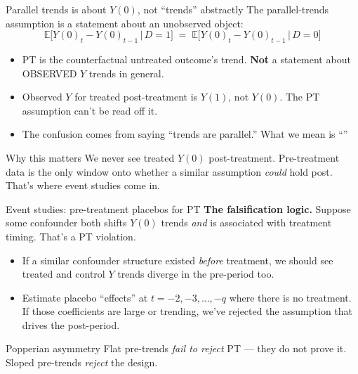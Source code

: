 \documentclass[aspectratio=169,11pt]{beamer}
\begin{document}
\begin{frame}{Parallel trends is about $Y(0)$, not ``trends'' abstractly}
\footnotesize
The parallel-trends assumption is a statement about an unobserved object:
\vspace{-0.3em}
\[
\mathbb{E}\!\big[Y(0)_{t} - Y(0)_{t-1} \,\big|\, D{=}1\big] \;=\; \mathbb{E}\!\big[Y(0)_{t} - Y(0)_{t-1} \,\big|\, D{=}0\big]
\]
\vspace{-0.4em}
\begin{itemize}\setlength\itemsep{2pt}
  \item PT is the counterfactual untreated outcome's trend. \;\textbf{Not} a statement about OBSERVED $Y$ trends in general.
  \item Observed $Y$ for treated post-treatment is $Y(1)$, not $Y(0)$. \;The PT assumption can't be read off it.
  \item The confusion comes from saying ``trends are parallel.'' \;What we mean is ``''
\end{itemize}
\begin{block}{Why this matters}
\scriptsize
We never see treated $Y(0)$ post-treatment. \;Pre-treatment data is the only window onto whether a similar assumption \textit{could} hold post. \;That's where event studies come in.
\end{block}
\end{frame}

\begin{frame}{Event studies: pre-treatment placebos for PT}
\vspace{0.2em}
\footnotesize
\textbf{The falsification logic.} \;Suppose some confounder both shifts $Y(0)$ trends \textit{and} is associated with treatment timing. \;That's a PT violation.

\vspace{0.4em}
\begin{itemize}\setlength\itemsep{3pt}
  \item If a similar confounder structure existed \textit{before} treatment, we should see treated and control $Y$ trends diverge in the pre-period too.
  \item Estimate placebo ``effects'' at $t=-2, -3, \ldots, -q$ where there is no treatment. If those coefficients are large or trending, we've rejected the assumption that drives the post-period.
\end{itemize}
\vspace{0.4em}
\begin{block}{Popperian asymmetry}
\small
Flat pre-trends \textit{fail to reject} PT --- they do not prove it. \\ Sloped pre-trends \textit{reject} the design.
\end{block}
\vspace{0.2em}
\begin{center}
\end{center}
\end{frame}
\end{document}
